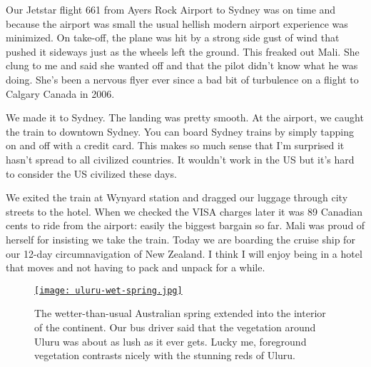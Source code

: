 Our Jetstar flight 661 from Ayers Rock Airport to Sydney was on time and
because the airport was small the usual hellish modern airport
experience was minimized. On take-off, the plane was hit by a strong
side gust of wind that pushed it sideways just as the wheels left the
ground. This freaked out Mali. She clung to me and said she wanted off
and that the pilot didn't know what he was doing. She's been a nervous
flyer ever since a bad bit of turbulence on a flight to Calgary Canada
in 2006.

We made it to Sydney. The landing was pretty smooth. At the airport, we
caught the train to downtown Sydney. You can board Sydney trains by
simply tapping on and off with a credit card. This makes so much sense
that I'm surprised it hasn't spread to all civilized countries. It
wouldn't work in the US but it's hard to consider the US civilized these
days.

We exited the train at Wynyard station and dragged our luggage through
city streets to the hotel. When we checked the VISA charges later it was
89 Canadian cents to ride from the airport: easily the biggest bargain
so far. Mali was proud of herself for insisting we take the train. Today
we are boarding the cruise ship for our 12-day circumnavigation of New
Zealand. I think I will enjoy being in a hotel that moves and not having
to pack and unpack for a while.


\captionsetup[figure]{labelformat=empty}
\begin{SCfigure}[50]
\centering
\href{https://conceptcontrol.smugmug.com/Trips/Overseas/Australia-New-Zealand-2022/i-W97WzvW/A}{\texttt{[image: uluru-wet-spring.jpg]}}
\caption[Uluru in spring]{The wetter-than-usual Australian spring extended into the
interior of the continent. Our bus driver said that the vegetation
around Uluru was about as lush as it ever gets. Lucky me, foreground
vegetation contrasts nicely with the stunning reds of Uluru.}
\label{fig:7573x4}
\end{SCfigure}

%

